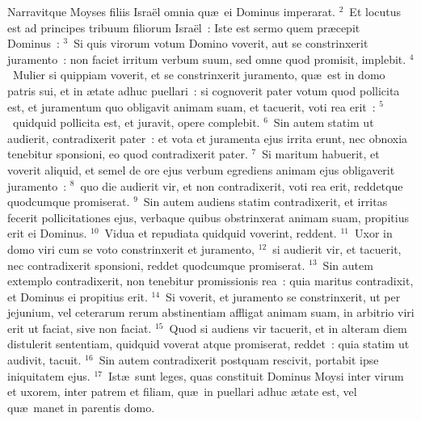 \lettrine[lines=3,image=true,loversize=0.05,lraise=-0.03]{N}{}arravitque Moyses filiis Isra\"el omnia qu\ae\ ei Dominus imperarat.
${}^{2}$~Et locutus est ad principes tribuum filiorum Isra\"el~: Iste est sermo quem pr\ae cepit Dominus~:
${}^{3}$~Si quis virorum votum Domino voverit, aut se constrinxerit juramento~: non faciet irritum verbum suum, sed omne quod promisit, implebit.
${}^{4}$~Mulier si quippiam voverit, et se constrinxerit juramento, qu\ae\ est in domo patris sui, et in \ae tate adhuc puellari~: si cognoverit pater votum quod pollicita est, et juramentum quo obligavit animam suam, et tacuerit, voti rea erit~:
${}^{5}$~quidquid pollicita est, et juravit, opere complebit.
${}^{6}$~Sin autem statim ut audierit, contradixerit pater~: et vota et juramenta ejus irrita erunt, nec obnoxia tenebitur sponsioni, eo quod contradixerit pater.
${}^{7}$~Si maritum habuerit, et voverit aliquid, et semel de ore ejus verbum egrediens animam ejus obligaverit juramento~:
${}^{8}$~quo die audierit vir, et non contradixerit, voti rea erit, reddetque quodcumque promiserat.
${}^{9}$~Sin autem audiens statim contradixerit, et irritas fecerit pollicitationes ejus, verbaque quibus obstrinxerat animam suam, propitius erit ei Dominus.
${}^{10}$~Vidua et repudiata quidquid voverint, reddent.
${}^{11}$~Uxor in domo viri cum se voto constrinxerit et juramento,
${}^{12}$~si audierit vir, et tacuerit, nec contradixerit sponsioni, reddet quodcumque promiserat.
${}^{13}$~Sin autem extemplo contradixerit, non tenebitur promissionis rea~: quia maritus contradixit, et Dominus ei propitius erit.
${}^{14}$~Si voverit, et juramento se constrinxerit, ut per jejunium, vel ceterarum rerum abstinentiam affligat animam suam, in arbitrio viri erit ut faciat, sive non faciat.
${}^{15}$~Quod si audiens vir tacuerit, et in alteram diem distulerit sententiam, quidquid voverat atque promiserat, reddet~: quia statim ut audivit, tacuit.
${}^{16}$~Sin autem contradixerit postquam rescivit, portabit ipse iniquitatem ejus.
${}^{17}$~Ist\ae\ sunt leges, quas constituit Dominus Moysi inter virum et uxorem, inter patrem et filiam, qu\ae\ in puellari adhuc \ae tate est, vel qu\ae\ manet in parentis domo.

